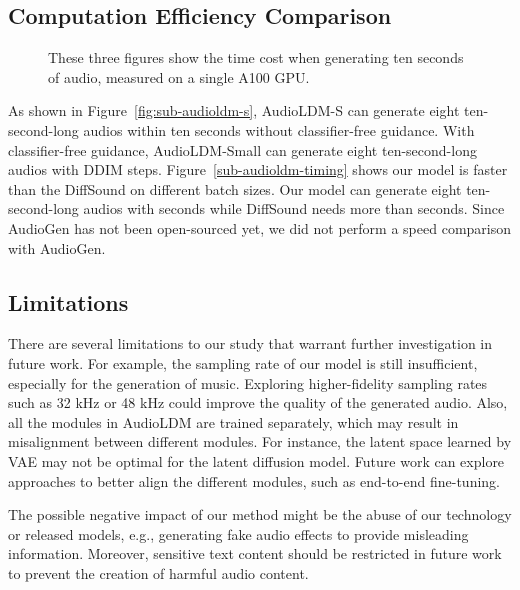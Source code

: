 \documentclass{article}
\begin{document}
\subsection{Computation Efficiency Comparison}

\begin{figure}[htbp]
  \centering
  \caption{These three figures show the time cost when generating ten seconds of audio, measured on a single A100 GPU.}
  \label{fig:speed-comparison}
\end{figure}

As shown in Figure~\ref{fig:sub-audioldm-s}, AudioLDM-S can generate eight ten-second-long audios within ten seconds without classifier-free guidance. With classifier-free guidance, AudioLDM-Small can generate eight ten-second-long audios with  DDIM steps. Figure~\ref{sub-audioldm-timing} shows our model is faster than the DiffSound on different batch sizes. Our model can generate eight ten-second-long audios with  seconds while DiffSound needs more than  seconds. Since AudioGen has not been open-sourced yet, we did not perform a speed comparison with AudioGen.

\subsection{Limitations}

There are several limitations to our study that warrant further investigation in future work. For example, the sampling rate of our model is still insufficient, especially for the generation of music. Exploring higher-fidelity sampling rates such as 32 kHz or 48 kHz could improve the quality of the generated audio. Also, all the modules in AudioLDM are trained separately, which may result in misalignment between different modules. For instance, the latent space learned by VAE may not be optimal for the latent diffusion model. Future work can explore approaches to better align the different modules, such as end-to-end fine-tuning.

The possible negative impact of our method might be the abuse of our technology or released models, e.g., generating fake audio effects to provide misleading information. Moreover, sensitive text content should be restricted in future work to prevent the creation of harmful audio content.
\end{document}
